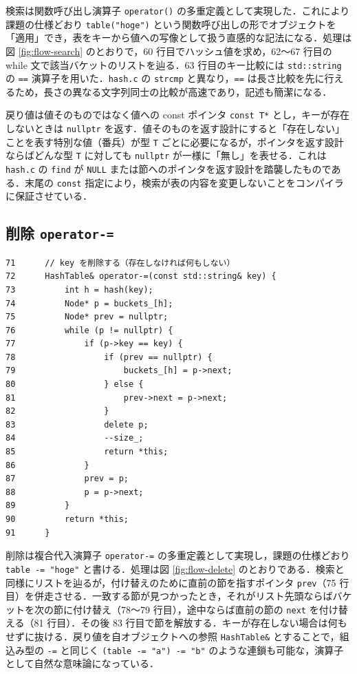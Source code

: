 検索は関数呼び出し演算子 {\tt operator()} の多重定義として実現した．これにより課題の仕様どおり {\tt table("hoge")} という関数呼び出しの形でオブジェクトを「適用」でき，表をキーから値への写像として扱う直感的な記法になる．処理は図 \ref{fig:flow-search} のとおりで，60 行目でハッシュ値を求め，62〜67 行目の while 文で該当バケットのリストを辿る．63 行目のキー比較には {\tt std::string} の {\tt ==} 演算子を用いた．{\tt hash.c} の {\tt strcmp} と異なり，{\tt ==} は長さ比較を先に行えるため，長さの異なる文字列同士の比較が高速であり，記述も簡潔になる．

戻り値は値そのものではなく値への const ポインタ {\tt const T*} とし，キーが存在しないときは {\tt nullptr} を返す．値そのものを返す設計にすると「存在しない」ことを表す特別な値（番兵）が型 {\tt T} ごとに必要になるが，ポインタを返す設計ならばどんな型 {\tt T} に対しても {\tt nullptr} が一様に「無し」を表せる．これは {\tt hash.c} の {\tt find} が {\tt NULL} または節へのポインタを返す設計を踏襲したものである．末尾の {\tt const} 指定により，検索が表の内容を変更しないことをコンパイラに保証させている．

\subsection{削除 {\tt operator-=}}

\begin{verbatim}
71      // key を削除する（存在しなければ何もしない）
72      HashTable& operator-=(const std::string& key) {
73          int h = hash(key);
74          Node* p = buckets_[h];
75          Node* prev = nullptr;
76          while (p != nullptr) {
77              if (p->key == key) {
78                  if (prev == nullptr) {
79                      buckets_[h] = p->next;
80                  } else {
81                      prev->next = p->next;
82                  }
83                  delete p;
84                  --size_;
85                  return *this;
86              }
87              prev = p;
88              p = p->next;
89          }
90          return *this;
91      }
\end{verbatim}

削除は複合代入演算子 {\tt operator-=} の多重定義として実現し，課題の仕様どおり {\tt table -= "hoge"} と書ける．処理は図 \ref{fig:flow-delete} のとおりである．検索と同様にリストを辿るが，付け替えのために直前の節を指すポインタ {\tt prev}（75 行目）を併走させる．一致する節が見つかったとき，それがリスト先頭ならばバケットを次の節に付け替え（78〜79 行目），途中ならば直前の節の {\tt next} を付け替える（81 行目）．その後 83 行目で節を解放する．キーが存在しない場合は何もせずに抜ける．戻り値を自オブジェクトへの参照 {\tt HashTable\&} とすることで，組込み型の {\tt -=} と同じく {\tt (table -= "a") -= "b"} のような連鎖も可能な，演算子として自然な意味論になっている．

